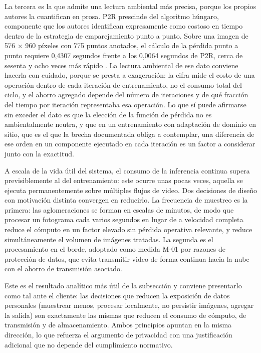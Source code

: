 La tercera es la que admite una lectura ambiental más precisa, porque
los propios autores la cuantifican en prosa. P2R prescinde del algoritmo
húngaro, componente que los autores identifican expresamente como
costoso en tiempo dentro de la estrategia de emparejamiento punto a
punto. Sobre una imagen de 576 × 960 píxeles con 775 puntos anotados, el
cálculo de la pérdida punto a punto requiere 0,4307 segundos frente a
los 0,0064 segundos de P2R, cerca de sesenta y ocho veces más rápido
\cite{Lin_2025_CVPR}. La lectura ambiental de ese dato conviene hacerla
con cuidado, porque se presta a exageración: la cifra mide el costo de
una operación dentro de cada iteración de entrenamiento, no el consumo
total del ciclo, y el ahorro agregado depende del número de iteraciones
y de qué fracción del tiempo por iteración representaba esa operación.
Lo que sí puede afirmarse sin exceder el dato es que la elección de la
función de pérdida no es ambientalmente neutra, y que en un
entrenamiento con adaptación de dominio en sitio, que es el que la
brecha documentada obliga a contemplar, una diferencia de ese orden en
un componente ejecutado en cada iteración es un factor a considerar
junto con la exactitud.

A escala de la vida útil del sistema, el consumo de la inferencia
continua supera previsiblemente al del entrenamiento: este ocurre unas
pocas veces, aquella se ejecuta permanentemente sobre múltiples flujos
de video. Dos decisiones de diseño con motivación distinta convergen en
reducirlo. La frecuencia de muestreo es la primera: las aglomeraciones
se forman en escalas de minutos, de modo que procesar un fotograma cada
varios segundos en lugar de a velocidad completa reduce el cómputo en un
factor elevado sin pérdida operativa relevante, y reduce simultáneamente
el volumen de imágenes tratadas. La segunda es el procesamiento en el
borde, adoptado como medida M-01 por razones de protección de datos, que
evita transmitir video de forma continua hacia la nube con el ahorro de
transmisión asociado.

Este es el resultado analítico más útil de la subsección y conviene
presentarlo como tal ante el cliente: las decisiones que reducen la
exposición de datos personales (muestrear menos, procesar localmente, no
persistir imágenes, agregar la salida) son exactamente las mismas que
reducen el consumo de cómputo, de transmisión y de almacenamiento. Ambos
principios apuntan en la misma dirección, lo que refuerza el argumento
de privacidad con una justificación adicional que no depende del
cumplimiento normativo.

